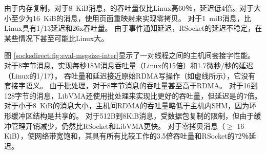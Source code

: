 由于内存复制，对于8~KiB消息，\sys 的吞吐量仅比Linux高60％，延迟低4倍。对于大小至少为16~KiB的消息，\sys 使用页面重映射来实现零拷贝。
对于1~miB消息，\sys 比Linux具有1/13延迟和26x吞吐量。
由于事件通知延迟，RSocket的延迟不稳定，在某些情况下甚至可能比Linux大。


图 \ref {socksdirect:fig:eval-msgsize-inter}显示了一对线程之间的主机间套接字性能。
对于8字节消息，\sys 实现每秒18M消息吞吐量（Linux的15倍）和1.7微秒/秒的延迟（Linux的1/17）。
吞吐量和延迟接近原始RDMA写操作（如虚线所示），它没有套接字语义。
由于批处理，\sys  {}对于8字节消息的吞吐量甚至高于RDMA。
对于16到128字节的消息，LibVMA还使用批处理来实现比\sys  {}更好的吞吐量，但延迟是\sys  {}的7倍。
对于小于8~KiB的消息大小，主机间RDMA的吞吐量略低于主机内SHM，因为环形缓冲区结构是共享的。
对于512B到8KiB消息，\sys  {}受数据包复制的限制，但由于缓冲管理开销减少，仍然比RSocket和LibVMA更快。
对于零拷贝消息（$\ge$ 16 KiB），\sys  {}使网络带宽饱和，其具有所有比较工作的3.5倍吞吐量和RSocket的72％延迟。



